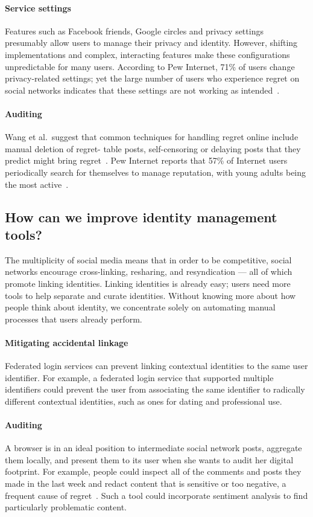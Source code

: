 \documentclass[10pt, conference, compsocconf]{IEEEtran}
\begin{document}
\paragraph{Service settings} Features such as Facebook friends,
Google circles and privacy settings presumably allow users to manage their
privacy and identity. However, shifting implementations and complex,
interacting features make these configurations unpredictable for many users.
According to Pew Internet, 71\% of users change privacy-related settings; yet
the large number of users who experience regret on social networks indicates
that these settings are not working as intended~\cite{pew3}.

\paragraph{Auditing} Wang et al.~suggest that common techniques
for handling regret online include manual deletion of regret- table posts,
self-censoring or delaying posts that they predict might bring
regret~\cite{wang}. Pew Internet reports that 57\% of Internet users
periodically search for themselves to manage reputation, with young adults
being the most active~\cite{pew3}.

\subsection{How can we improve identity management tools?}

The multiplicity of social media means that
in order to be competitive, social networks encourage cross-linking,
resharing, and resyndication --- all of which promote linking identities.
Linking identities is already easy;
users need more tools to help separate and curate identities. Without
knowing more about how people think about identity, we concentrate solely on
automating manual processes that users already perform.

\paragraph{Mitigating accidental linkage} Federated login services can prevent
linking contextual identities to the same user identifier. For example, a
federated login service that supported multiple identifiers could prevent the
user from associating the same identifier to radically different
contextual identities, such as ones for dating and professional use.

\paragraph{Auditing}
A browser is in an ideal position to intermediate social network
posts, aggregate them locally, and present them to its user when she wants to
audit her digital footprint.  For example, people could inspect all of the
comments and posts they made in the last week and redact content that is
sensitive or too negative, a frequent cause of regret~\cite{wang}. 
Such a tool could incorporate sentiment analysis to find
particularly problematic content.
\end{document}
